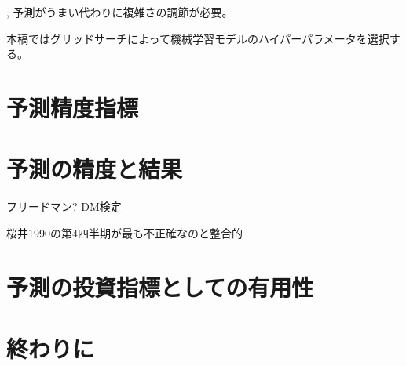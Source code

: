 \documentclass[a4paper, 12pt]{jsreport}
\begin{document}
\cite*{cao2020fundamental}, 予測がうまい代わりに複雑さの調節が必要。

本稿ではグリッドサーチによって機械学習モデルのハイパーパラメータを選択する。


\chapter{予測精度指標}

\chapter{予測の精度と結果}

フリードマン?
DM検定

桜井1990の第4四半期が最も不正確なのと整合的

\chapter{予測の投資指標としての有用性}

\chapter{終わりに}



\end{document}
